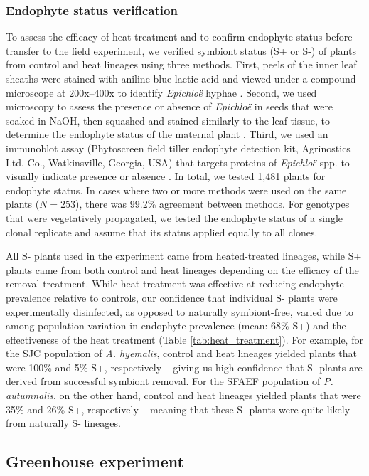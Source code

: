 \documentclass[12pt]{article}\usepackage[]{graphicx}\usepackage[dvipsnames]{xcolor}
\begin{document}
\subsubsection {Endophyte status verification}
To assess the efficacy of heat treatment and to confirm endophyte status before transfer to the field experiment, we verified symbiont status (S+ or S-) of plants from control and heat lineages using three methods. 
First, peels of the inner leaf sheaths were stained with aniline blue lactic acid and viewed under a compound microscope at 200x–400x to identify \emph{Epichloë} hyphae \citep{jackson1988rapid}. 
Second, we used microscopy to assess the presence or absence of \emph{Epichloë} in seeds that were soaked in NaOH, then squashed and stained similarly to the leaf tissue, to determine the endophyte status of the maternal plant \citep{fowler2025increasing}. 
Third, we used an immunoblot assay (Phytoscreen field tiller endophyte detection kit, Agrinostics Ltd. Co., Watkinsville, Georgia, USA) that targets proteins of \emph{Epichloë} spp. to visually indicate presence or absence \citep{koh2006rapid}. 
In total, we tested 1,481 plants for endophyte status. 
In cases where two or more methods were used on the same plants ($N=253$), there was 99.2\% agreement between methods.
For genotypes that were vegetatively propagated, we tested the endophyte status of a single clonal replicate and assume that its status applied equally to all clones. 

All S- plants used in the experiment came from heated-treated lineages, while S+ plants came from both control and heat lineages depending on the efficacy of the removal treatment. 
While heat treatment was effective at reducing endophyte prevalence relative to controls, our confidence that individual S- plants were experimentally disinfected, as opposed to naturally symbiont-free, varied due to among-population variation in endophyte prevalence (mean: 68\% S+) and the effectiveness of the heat treatment (Table \ref{tab:heat_treatment}). 
For example, for the SJC population of \emph{A. hyemalis}, control and heat lineages yielded plants that were 100\% and 5\% S+, respectively -- giving us high confidence that S- plants are derived from successful symbiont removal. 
For the SFAEF population of \emph{P. autumnalis}, on the other hand, control and heat lineages yielded plants that were 35\% and 26\% S+, respectively -- meaning that these S- plants were quite likely from naturally S- lineages.


\subsection{Greenhouse experiment}
\label{sec:greenhouse}
\end{document}
